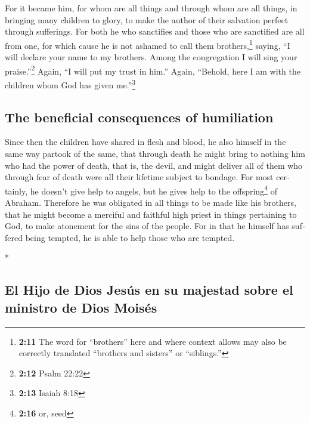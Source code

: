 \begin{paracol}{2}
\begin{otherlanguage}{english}
 For it became him, for whom are all things and through
whom are all things, in bringing many children to glory, to make the
author of their salvation perfect through sufferings. 
For both he who sanctifies and those who are sanctified are all from
one, for which cause he is not ashamed to call them brothers,\footnote{\textbf{2:11}
  The word for ``brothers'' here and where context allows may also be
  correctly translated ``brothers and sisters'' or ``siblings.''}
 saying, ``I will declare your name to my brothers. Among
the congregation I will sing your praise.''\footnote{\textbf{2:12} Psalm
  22:22}  Again, ``I will put my trust in him.'' Again,
``Behold, here I am with the children whom God has given
me.''\footnote{\textbf{2:13} Isaiah 8:18}

\hypertarget{the-beneficial-consequences-of-humiliation}{%
\subsection{The beneficial consequences of
humiliation}\label{the-beneficial-consequences-of-humiliation}}

 Since then the children have shared in flesh and blood,
he also himself in the same way partook of the same, that through death
he might bring to nothing him who had the power of death, that is, the
devil,  and might deliver all of them who through fear of
death were all their lifetime subject to bondage.  For
most certainly, he doesn't give help to angels, but he gives help to the
offspring\footnote{\textbf{2:16} or, seed} of Abraham. 
Therefore he was obligated in all things to be made like his brothers,
that he might become a merciful and faithful high priest in things
pertaining to God, to make atonement for the sins of the people.
 For in that he himself has suffered being tempted, he is
able to help those who are tempted.

\end{otherlanguage}

\switchcolumn[0]*

\hypertarget{el-hijo-de-dios-jesuxfas-en-su-majestad-sobre-el-ministro-de-dios-moisuxe9s}{%
\subsection{El Hijo de Dios Jesús en su majestad sobre el ministro de
Dios
Moisés}\label{el-hijo-de-dios-jesuxfas-en-su-majestad-sobre-el-ministro-de-dios-moisuxe9s}}


\end{paracol}
